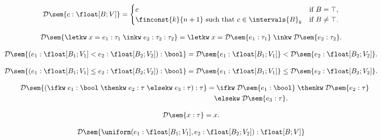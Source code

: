 \begin{figure}[t]
    \centering
    \footnotesize

    \begin{align}
        \mathcal{D}\sem{c : \float[B;V]} &=
        \begin{cases}
            c & \text{if } B = \top, \\
            \finconst{k}{n+1} \text{ such that } c \in \intervals{B}_k & \text{if } B \neq \top.
        \end{cases}
    \end{align}

    \vspace{0.5em}

    \begin{align}
        \mathcal{D}\sem{\letkw\; x = e_1 : \tau_1\; \inkw\; e_2 : \tau_2 : \tau_2} &=
        \letkw\; x = \mathcal{D}\sem{e_1 : \tau_1}\; \inkw\; \mathcal{D}\sem{e_2 : \tau_2}.
    \end{align}

    \begin{align}
        \mathcal{D}\sem{(e_1 : \float[B_1;V_1] < e_2 : \float[B_2;V_2]) : \bool} &=
        \mathcal{D}\sem{e_1 : \float[B_1;V_1]} < \mathcal{D}\sem{e_2 : \float[B_2;V_2]}.
    \end{align}

    \begin{align}
        \mathcal{D}\sem{(e_1 : \float[B_1;V_1] \leq e_2 : \float[B_2;V_2]) : \bool} &=
        \mathcal{D}\sem{e_1 : \float[B_1;V_1]} \leq \mathcal{D}\sem{e_2 : \float[B_2;V_2]}.
    \end{align}

    \begin{align}
        \mathcal{D}\sem{(\ifkw\; e_1 : \bool\; \thenkw\; e_2 : \tau\; \elsekw\; e_3 : \tau) : \tau} &=
        \ifkw\; \mathcal{D}\sem{e_1 : \bool}\; \thenkw\; \mathcal{D}\sem{e_2 : \tau} \notag \\
        &\quad \elsekw\; \mathcal{D}\sem{e_3 : \tau}.
    \end{align}

    \begin{align}
        \mathcal{D}\sem{x : \tau} &= x.
    \end{align}

    \vspace{1em}

    \begin{align}
        \mathcal{D}\sem{\uniform(e_1 : \float[B_1;V_1], e_2 : \float[B_2;V_2]) : \float[B;V]} &
    \end{align}


\end{figure}
